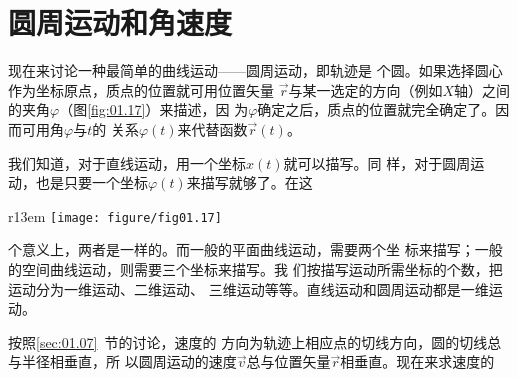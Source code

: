 \documentclass[../outline-of-mechanics.tex]{subfiles}
\begin{document}
\section{圆周运动和角速度}\label{sec:01.09}

现在来讨论一种最简单的曲线运动——圆周运动，即轨迹是
个圆。如果选择圆心作为坐标原点，质点的位置就可用位置矢量
$\vec{r}$与某一选定的方向（例如$X$轴）之间的夹角$\varphi$（图\ref{fig:01.17}）来描述，因
为$\varphi$确定之后，质点的位置就完全确定了。因而可用角$\varphi$与$t$的
关系$\varphi\left(t\right)$来代替函数$\vec{r}\left(t\right)$。

我们知道，对于直线运动，用一个坐标$x\left(t\right)$就可以描写。同
\clearpage
\noindent 样，对于圆周运动，也是只要一个坐标$\varphi\left(t\right)$来描写就够了。在这
\begin{wrapfigure}[9]{r}{13em}
  \centering \small
  \texttt{[image: figure/fig01.17]}
  \caption{圆周运动}
  \label{fig:01.17}
\end{wrapfigure}
个意义上，两者是一样的。而一般的平面曲线运动，需要两个坐
标来描写；一般的空间曲线运动，则需要三个坐标来描写。我
们按描写运动所需坐标的个数，把运动分为一维运动、二维运动、
三维运动等等。直线运动和圆周运动都是一维运动。

按照\ref{sec:01.07}~节的讨论，速度的
方向为轨迹上相应点的切线方向，圆的切线总与半径相垂直，所
以圆周运动的速度$\vec{v}$总与位置矢量$\vec{r}$相垂直。现在来求速度的
\end{document}
